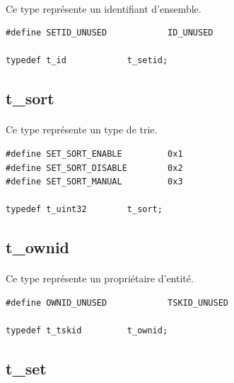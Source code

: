 \documentclass[10pt,a4wide]{article}
\begin{document}
\paragraph{}

Ce type repr\'esente un identifiant d'ensemble.

\begin{verbatim}
#define SETID_UNUSED            ID_UNUSED

typedef t_id            t_setid;
\end{verbatim}

\subsection{t\_sort}

\paragraph{}

Ce type repr\'esente un type de trie.

\begin{verbatim}
#define SET_SORT_ENABLE         0x1
#define SET_SORT_DISABLE        0x2
#define SET_SORT_MANUAL         0x3

typedef t_uint32        t_sort;
\end{verbatim}

\subsection{t\_ownid}

\paragraph{}

Ce type repr\'esente un propri\'etaire d'entit\'e.

\begin{verbatim}
#define OWNID_UNUSED            TSKID_UNUSED

typedef t_tskid         t_ownid;
\end{verbatim}

\subsection{t\_set}

\paragraph{}
\end{document}
